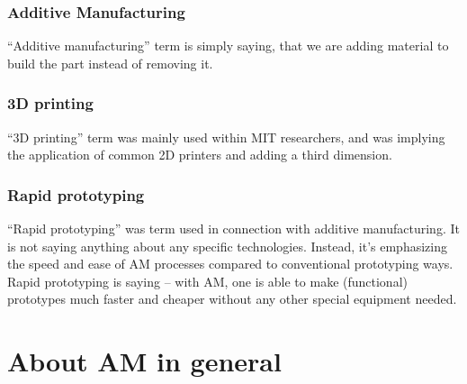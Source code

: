\documentclass[a4paper]{report}
\begin{document}
\subsection{Additive Manufacturing}
“Additive manufacturing” term is simply saying, that we are adding material to build the part instead of removing it.
\subsection{3D printing}
“3D printing” term was mainly used within MIT researchers, and was implying the application of common 2D printers and adding a third dimension.
\subsection{Rapid prototyping}
“Rapid prototyping” was term used in connection with additive manufacturing. It is not saying anything about any specific technologies. Instead, it’s emphasizing the speed and ease of AM processes compared to conventional prototyping ways. Rapid prototyping is saying – with AM, one is able to make (functional) prototypes much faster and cheaper without any other special equipment needed.\\

%
%
%
\chapter{About AM in general}
%
\end{document}
